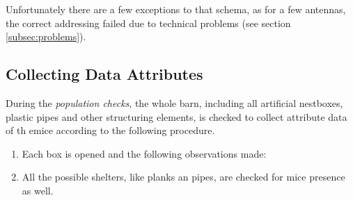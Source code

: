 Unfortunately there are a few exceptions to that schema, as for a few antennas, the correct addressing failed due to technical problems (see section \ref{subsec:problems}).

% 

\subsection{Collecting Data Attributes}
\label{subsec:dataattr}

During the \textit{population checks}, the whole barn, including all artificial nestboxes, plastic pipes and other structuring elements, is checked to collect attribute data of th emice according to the following procedure.

\begin{enumerate} 
	\item Each box is opened and the following observations made:
	\item All the possible shelters, like planks an pipes, are checked for mice presence as well.
\end{enumerate}

